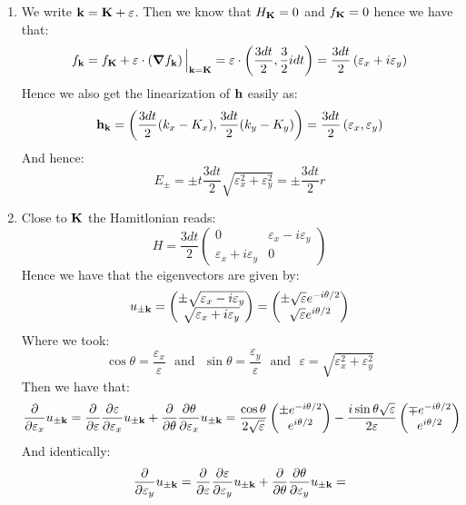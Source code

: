 \documentclass[10pt,a4paper]{article}
\begin{document}
\begin{enumerate}
\item We write $\vb{k} = \vb{K} + \vb{\varepsilon}$. Then we know that $H_{\vb{K}} = 0$ and $f_{\vb{K}} = 0$ hence we have that:
\[
f_{\vb{k}} = f_{\vb{K}}  + \vb{\varepsilon} \cdot \left(\grad f_{\vb{k}} \right) \Big|_{\vb{k} = \vb{K}} = \vb{\varepsilon} \cdot \left( \frac{3 d t}{2}, \frac{3}{2} i d t  \right) = \frac{3dt}{2}\left( \varepsilon_x + i \varepsilon_y \right)
\] 
Hence we also get the linearization of $\vb{h}$ easily as:
\[
\vb{h}_{\vb{k}} = \left(\frac{3dt}{2} (k_x - K_x), \frac{3 dt}{2} (k_y - K_y)\right)  = \frac{3 dt}{2}\left(\varepsilon_x,  \varepsilon_y \right)
\]
And hence:
\[
E_\pm = \pm t \frac{3 dt}{2} \sqrt{\varepsilon_x^2 + \varepsilon_y^2} = \pm \frac{3 d t}{2} r 
\]

\item Close to $\vb{K}$ the Hamitlonian reads:
\[
H = \frac{3 d t}{2}\begin{pmatrix}
0 & \varepsilon_x - i \varepsilon_y\\
\varepsilon_x + i \varepsilon_y & 0 
\end{pmatrix}
\]
Hence we have that the eigenvectors are given by:
\[
u_{\pm \vb{k}} = \begin{pmatrix}
\pm \sqrt{\varepsilon_x - i \varepsilon_y}\\
\sqrt{\varepsilon_x + i \varepsilon_y}
\end{pmatrix} = \begin{pmatrix}
\pm \sqrt{\varepsilon} e^{-i \theta/2}\\
\sqrt{\varepsilon} e^{i \theta/2} 
\end{pmatrix}
\]
Where we took:
\[
\cos \theta = \frac{\varepsilon_x}{\varepsilon} \mbox{~~and~~} \sin \theta = \frac{\varepsilon_y}{\varepsilon} \mbox{~~and~~} \varepsilon = \sqrt{\varepsilon_x^2 + \varepsilon_y^2}
\]
Then we have that:
\[
\pdv{}{\varepsilon_x} u_{\pm \vb{k}} = \pdv{}{\varepsilon} \pdv{\varepsilon}{\varepsilon_x} u_{\pm \vb{k}} + \pdv{}{\theta} \pdv{\theta}{\varepsilon_x} u_{\pm \vb{k}} = \frac{\cos\theta}{2 \sqrt{\varepsilon}} \begin{pmatrix}
\pm e^{-i\theta/2}\\
e^{i\theta/2}
\end{pmatrix}
- \frac{i \sin\theta \sqrt{\varepsilon}}{2\varepsilon}\begin{pmatrix}
\mp e^{-i\theta/2}\\
e^{i\theta/2}
\end{pmatrix}
\]
And identically:
\[
\pdv{}{\varepsilon_y} u_{\pm \vb{k}} = \pdv{}{\varepsilon} \pdv{\varepsilon}{\varepsilon_y} u_{\pm \vb{k}} + \pdv{}{\theta} \pdv{\theta}{\varepsilon_y} u_{\pm \vb{k}} = 
\]
\end{enumerate}
\end{document}
